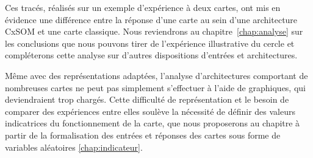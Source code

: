 \documentclass[../main]{subfiles}
\begin{document}
Ces tracés, réalisés sur un exemple d'expérience à deux cartes, ont mis en évidence une différence entre la réponse d'une carte au sein d'une architecture CxSOM et une carte classique.
Nous reviendrons au chapitre~\ref{chap:analyse} sur les conclusions que nous pouvons tirer de l'expérience illustrative du cercle et compléterons cette analyse sur d'autres dispositions d'entrées et architectures.

Même avec des représentations adaptées, l'analyse d'architectures comportant de nombreuses cartes ne peut pas simplement s'effectuer à l'aide de graphiques, qui deviendraient trop chargés. 
Cette difficulté de représentation et le besoin de comparer des expériences entre elles soulève la nécessité de définir des valeurs indicatrices du fonctionnement de la carte, que nous proposerons au chapitre à partir de la formalisation des entrées et réponses des cartes sous forme de variables aléatoires \ref{chap:indicateur}.

\ifSubfilesClassLoaded{
    \printbibliography
}{}
\end{document}
